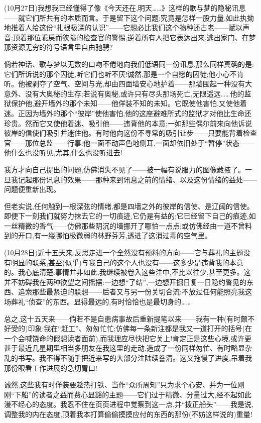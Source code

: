 (10月27日)我想我已经懂得了像《今天还在,明天……》这样的歌与梦的隐秘讯息——就它们所共有的本质而言。于是留下这个问题:究竟是怎样一股力量\dmark{},如此执拗地推着人给这份“扎根极深的认识”——它想必比我们这个物种还古老——赋以声音;顶着那位乖戾而狭隘的检查官的警惕,逆着所有人把它表达出来,逃出家门、在梦那资源无穷的符号语言里自由驰骋?

倘若神话、歌与梦以无数的口吻不倦地向我们低语同一份讯息,那么同样真确的是:它们所诉说的那个囚徒,听它们也听不厌!诚然,那是一个自愿的囚徒;他小心不肯听。他被剥夺了空气、空间与光,却由四面墙安心地护着——那墙围起一种没有大意外、没有大奥秘的生存;若说有奥秘,或许只有尽头那场死亡,无限遥远……他的监狱保护他,避开墙外的那个未知——他佯装不知的未知。它既使他害怕,又使他着迷。正因为墙外的那个“彼岸”使他害怕,他的这座避难所式的监狱才对他比生命还珍贵。然而它又使他着迷、吸引他——违背他的本意;一如那些偶尔前来向他诉说彼岸的信使们吸引并迷住他。有时他向这份不寻常的吸引让步——只要能背着检查官——那位总监——行事:他一面不动声色地侧耳,一面却依旧处于“暂停”状态——他什么也没听见,尤其,什么也没听进去!

我方才向自己提出的问题,仿佛消失不见了——被一幅有说服力的图像藏掖了。一旦我记起那份讯息的效果——那种来到讯息之前的情绪、以及这份情绪的益处——问题便重新出现。

但老实说,任何触到一根深弦的情绪,都是四墙之外的彼岸的信使、是辽阔的信使。即便下一刻我们就努力抹去它的一切痕迹,它仍是有益的;它已经留下自己的痕迹,如一丝精微的香气——仿佛那些阴沉的墙挪开了哪怕一点点;或仿佛经由一道不曾料到的开口,有一缕哪怕极微弱的林野芬芳,透进了这消过毒的空气里。

\dmark{}(10月28日)近十五天来,反思走进一个全然没有预料的方向——它与葬礼的主题没有明显的联系,甚至(似乎)与我自己的这个人也没有——这多少是违背我的本意的。我心底清楚:事情并非如此,我继续被卷入这些注中,不比以往少,甚至更多。这并不妨碍我在两种欲望之间摇摆:一边想“了结”,一边想开掘日复一日隐约瞥见的东西、追索那些最紧迫的联想——后者又与另一份关切合流:不放过任何能照亮我这场葬礼“侦查”的东西。显得最远的,有时恰恰也是最切身的……

总之,这十五天来——倘若不是自患病事故后重新提笔以来——我有一种(有时颇不好受的)印象:我在“赶工”、匆匆忙忙;仿佛每一条新注都是我又一道打开的括号(在一个会喊饶命的假想读者面前),而我理应尽快把它关上!肯定正是这些心境,或许更甚于最近几星期里相当多朋友在我这里的走动,造成了一份同样匆忙、有时略显杂乱的书写。我不得不随手把近来写的大部分注陆续誊清。这又拖慢了进度,吊着我那份眼看工作进展的急切胃口!

诚然,这些我有时佯装要趁热打铁、当作“众所周知”只为求个心安、并为一位刚刚“下船”的读者之益而费心显豁的主题——它们过于精微、分量过大,经不起如此漫不经心的态度。我忍不住在页页进程中觉察到这一点,并“拨正船头”——我是说,调整我的内在态度,顶着我本打算偷偷摸摸应付的东西的那份(不妨这样说的)重量!

